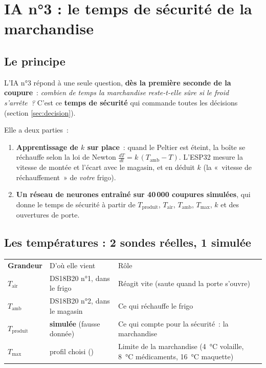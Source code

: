 \section{IA n°3 : le temps de sécurité de la marchandise}\label{sec:ia3}

\subsection{Le principe}
L'IA n°3 répond à une seule question, \textbf{dès la première seconde de la coupure}~: \emph{combien de temps la marchandise reste-t-elle sûre si le froid s'arrête~?} C'est ce \textbf{temps de sécurité} qui commande toutes les décisions (section \ref{sec:decision}).

Elle a deux parties~:
\begin{enumerate}[nosep, leftmargin=2em]
  \item \textbf{Apprentissage de $k$ sur place}~: quand le Peltier est éteint, la boîte se réchauffe selon la loi de Newton $\frac{dT}{dt} = k\,(T_{\text{amb}} - T)$. L'ESP32 mesure la vitesse de montée et l'écart avec le magasin, et en déduit $k$ (la «~vitesse de réchauffement~» de \emph{votre} frigo).
  \item \textbf{Un réseau de neurones entraîné sur 40\,000 coupures simulées}, qui donne le temps de sécurité à partir de $T_{\text{produit}}$, $T_{\text{air}}$, $T_{\text{amb}}$, $T_{\max}$, $k$ et des ouvertures de porte.
\end{enumerate}

\subsection{Les températures : 2 sondes réelles, 1 simulée}
\begin{tabularx}{\linewidth}{P{2.6cm}P{3.6cm}L}
 \textbf{Grandeur} & D'où elle vient & Rôle \\
$T_{\text{air}}$ & DS18B20 n°1, dans le frigo & Réagit vite (saute quand la porte s'ouvre) \\
$T_{\text{amb}}$ & DS18B20 n°2, dans le magasin & Ce qui réchauffe le frigo \\
$T_{\text{produit}}$ & \textbf{simulée} (fausse donnée) & Ce qui compte pour la sécurité~: la marchandise \\
$T_{\max}$ & profil choisi () & Limite de la marchandise (4~°C volaille, 8~°C médicaments, 16~°C maquette) \\
\end{tabularx}

